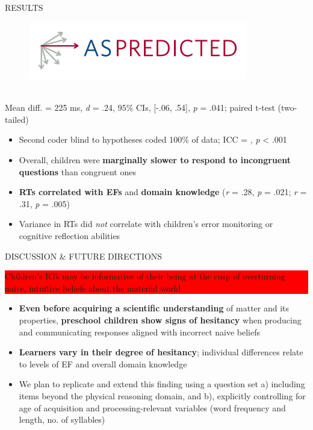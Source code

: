 \documentclass[final]{beamer}
\newlength{\colwidth}
\newlength{\widecolwidth}
\begin{document}
\begin{frame}[t]
\begin{columns}[t]
\begin{column}{\widecolwidth}
\begin{block}{RESULTS}
\begin{minipage}{0.45\textwidth}
\begin{figure}
      \href{https://aspredicted.org/DJG_YWR}{\includegraphics[height=2.5cm]{images/aspredicted.png}}
\end{figure}
\\[2ex]
Mean diff. = 225 ms, \emph{d}  = .24, 95\% CIs, [-.06, .54], \emph{p} = .041; paired t-test (two-tailed)\\[2ex]
    \begin{itemize}
        \item Second coder blind to hypotheses coded 100\% of data; ICC = , \emph{p} < .001
        \item Overall, children were \textbf{marginally slower to respond to incongruent questions} than congruent ones
        \item \textbf{RTs correlated with EFs} and \textbf{domain knowledge} (\emph{r} = .28, \emph{p} = .021; \emph{r} = .31, \emph{p} = .005)
        \item Variance in RTs did \emph{not} correlate with children's error monitoring or cognitive reflection abilities
    \end{itemize}
\end{minipage}
\end{block}
    
\begin{block}{DISCUSSION \& FUTURE DIRECTIONS}
	\colorbox{red}{%
	\parbox{\dimexpr\linewidth-2\fboxsep-2\fboxrule}{%
	\center
	Children's RTs may be informative of their being at the cusp of overturning naive, intuitive beliefs about the material world
	}%
	}
	
    \begin{itemize}
      \item \textbf{Even before acquiring a scientific understanding} of matter and its properties, \textbf{preschool children show signs of hesitancy} when producing and communicating responses aligned with incorrect naive beliefs
      \item \textbf{Learners vary in their degree of hesitancy}; individual differences relate to levels of EF and overall domain knowledge
      \item We plan to replicate and extend this finding using a question set a) including items beyond the physical reasoning domain, and b), explicitly controlling for age of acquisition and processing-relevant variables (word frequency and length, no. of syllables)
    \end{itemize}
\end{block}


\end{column}
\end{columns}
\end{frame}
\end{document}
